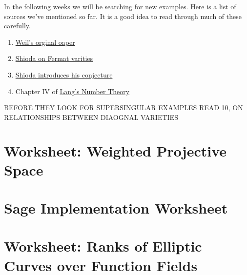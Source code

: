 \documentclass[12pt]{article}
\begin{document}
In the following weeks we will be searching for new examples. Here is a list of sources we've mentioned so far. It is a good idea to read through much of these carefully. 

\begin{enumerate}
\item \href{http://www.ams.org/journals/bull/1949-55-05/S0002-9904-1949-09219-4/S0002-9904-1949-09219-4.pdf}{Weil's orginal oaper}
\item \href{https://projecteuclid.org/journals/tohoku-mathematical-journal/volume-31/issue-1/On-Fermat-varieties/10.2748/tmj/1178229881.full}{Shioda on Fermat varities}
\item \href{https://link.springer.com/article/10.1007/BF01370660}{Shioda introduces his conjecture}
\item Chapter IV of \href{https://link.springer.com/book/10.1007/978-1-4612-0853-2}{Lang's Number Theory}
\end{enumerate}

BEFORE THEY LOOK FOR SUPERSINGULAR EXAMPLES READ 10, ON RELATIONSHIPS BETWEEN DIAOGNAL VARIETIES


\section{Worksheet: Weighted Projective Space}

\section{Sage Implementation Worksheet}

\section{Worksheet: Ranks of Elliptic Curves over Function Fields}

\printbibliography
\end{document}
